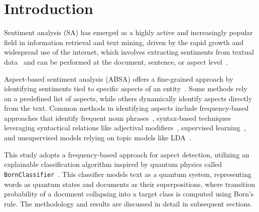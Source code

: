 
\section{Introduction}\label{sec1}

Sentiment analysis (SA) has emerged as a highly active and increasingly popular field in information retrieval and text mining, driven by the rapid growth and widespread use of the internet, which involves extracting sentiments from textual data~\cite{rana2016aspect} and can be performed at the document, sentence, or aspect level~\cite{liu2022sentiment}.

Aspect-based sentiment analysis (ABSA) offers a fine-grained approach by identifying sentiments tied to specific aspects of an entity~\cite{schouten2015survey, hu2004mining2}. Some methods rely on a predefined list of aspects, while others dynamically identify aspects directly from the text. Common methods in identifying aspects include frequency-based approaches that identify frequent noun phrases~\cite{hu2004mining, hu2004mining2, scaffidi2007red}, syntax-based techniques leveraging syntactical relations like adjectival modifiers~\cite{zhao2010generalizing, qiu2009expanding, zhang2010extracting}, supervised learning~\cite{jakob2010extracting}, and unsupervised models relying on topic models like LDA~\cite{blei2003latent, hofmann1999learning}.

This study adopts a frequency-based approach for aspect detection, utilizing an explainable classification algorithm inspired by quantum physics called \texttt{BornClassifier}~\cite{guidotti2022text}. This classifier models text as a quantum system, representing words as quantum states and documents as their superpositions, where transition probability of a document collapsing into a target class is computed using Born's rule. The methodology and results are discussed in detail in subsequent sections.